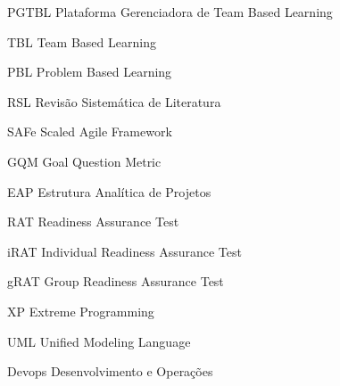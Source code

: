\begin{siglas}
  \item[PGTBL] Plataforma Gerenciadora de Team Based Learning
  \item[TBL] Team Based Learning
  \item[PBL] Problem Based Learning
  \item[RSL] Revisão Sistemática de Literatura
  \item[SAFe] Scaled Agile Framework
  \item[GQM] Goal Question Metric
  \item[EAP] Estrutura Analítica de Projetos
  \item[RAT] Readiness Assurance Test
  \item[iRAT] Individual Readiness Assurance Test
  \item[gRAT] Group Readiness Assurance Test
  \item[XP] Extreme Programming
  \item[UML] Unified Modeling Language
  \item[Devops] Desenvolvimento e Operações
\end{siglas}
